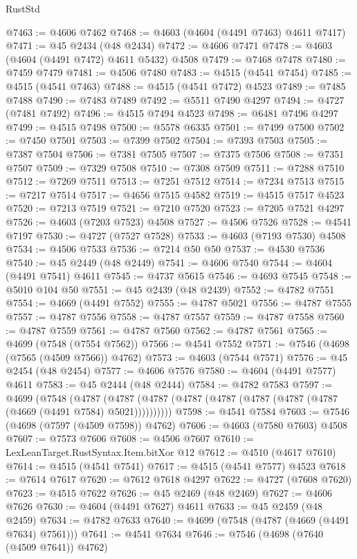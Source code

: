 \begin{lexlean}{RustStd}
\begin{coremodule}
@7463 := @4606 @7462
@7468 := @4603 (@4604 (@4491 @7463) @4611 @7417)
@7471 := @45 @2434 (@48 @2434)
@7472 := @4606 @7471
@7478 := @4603 (@4604 (@4491 @7472) @4611 @5432) @4508
@7479 := @7468 @7478
@7480 := @7459 @7479
@7481 := @4506 @7480
@7483 := @4515 (@4541 @7454)
@7485 := @4515 (@4541 @7463)
@7488 := @4515 (@4541 @7472) @4523
@7489 := @7485 @7488
@7490 := @7483 @7489
@7492 := @5511 @7490 @4297
@7494 := @4727 (@7481 @7492)
@7496 := @4515 @7494 @4523
@7498 := @6481 @7496 @4297
@7499 := @4515 @7498
@7500 := @5578 @6335
@7501 := @7499 @7500
@7502 := @7450 @7501
@7503 := @7399 @7502
@7504 := @7393 @7503
@7505 := @7387 @7504
@7506 := @7381 @7505
@7507 := @7375 @7506
@7508 := @7351 @7507
@7509 := @7329 @7508
@7510 := @7308 @7509
@7511 := @7288 @7510
@7512 := @7269 @7511
@7513 := @7251 @7512
@7514 := @7234 @7513
@7515 := @7217 @7514
@7517 := @4656 @7515 @4582
@7519 := @4515 @7517 @4523
@7520 := @7213 @7519
@7521 := @7210 @7520
@7523 := @7205 @7521 @4297
@7526 := @4603 (@7203 @7523) @4508
@7527 := @4506 @7526
@7528 := @4541 @7197
@7530 := @4727 (@7527 @7528)
@7533 := @4603 (@7193 @7530) @4508
@7534 := @4506 @7533
@7536 := @7214 @50 @50
@7537 := @4530 @7536
@7540 := @45 @2449 (@48 @2449)
@7541 := @4606 @7540
@7544 := @4604 (@4491 @7541) @4611
@7545 := @4737 @5615
@7546 := @4693 @7545
@7548 := @5010 @104 @50
@7551 := @45 @2439 (@48 @2439)
@7552 := @4782 @7551
@7554 := @4669 (@4491 @7552)
@7555 := @4787 @5021
@7556 := @4787 @7555
@7557 := @4787 @7556
@7558 := @4787 @7557
@7559 := @4787 @7558
@7560 := @4787 @7559
@7561 := @4787 @7560
@7562 := @4787 @7561
@7565 := @4699 (@7548 (@7554 @7562))
@7566 := @4541 @7552
@7571 := @7546 (@4698 (@7565 (@4509 @7566)) @4762)
@7573 := @4603 (@7544 @7571)
@7576 := @45 @2454 (@48 @2454)
@7577 := @4606 @7576
@7580 := @4604 (@4491 @7577) @4611
@7583 := @45 @2444 (@48 @2444)
@7584 := @4782 @7583
@7597 := @4699
    (@7548
      (@4787 (@4787 (@4787 (@4787 (@4787 (@4787 (@4787 (@4787 (@4669 (@4491 @7584) @5021))))))))))
@7598 := @4541 @7584
@7603 := @7546 (@4698 (@7597 (@4509 @7598)) @4762)
@7606 := @4603 (@7580 @7603) @4508
@7607 := @7573 @7606
@7608 := @4506 @7607
@7610 := LexLeanTarget.RustSyntax.Item.bitXor @12
@7612 := @4510 (@4617 @7610)
@7614 := @4515 (@4541 @7541)
@7617 := @4515 (@4541 @7577) @4523
@7618 := @7614 @7617
@7620 := @7612 @7618 @4297
@7622 := @4727 (@7608 @7620)
@7623 := @4515 @7622
@7626 := @45 @2469 (@48 @2469)
@7627 := @4606 @7626
@7630 := @4604 (@4491 @7627) @4611
@7633 := @45 @2459 (@48 @2459)
@7634 := @4782 @7633
@7640 := @4699 (@7548 (@4787 (@4669 (@4491 @7634) @7561)))
@7641 := @4541 @7634
@7646 := @7546 (@4698 (@7640 (@4509 @7641)) @4762)

\end{coremodule}
\end{lexlean}
